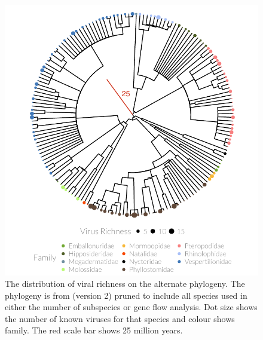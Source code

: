 \begin{knitrout}\footnotesize
{}\color{fgcolor}\begin{figure}[t]

{\centering \includegraphics[width=1\textwidth,trim = 0cm 0cm 0cm 0cm]{figure/A-treePlot2-1} 

}

\caption[Pruned alternative phylogeny with dot size showing number of pathogens and colour showing family.]{
The distribution of viral richness on the alternate phylogeny.
The phylogeny is from \textcite{jones2005bats} (version 2) pruned to include all species used in either the number of subspecies or gene flow analysis.
Dot size shows the number of known viruses for that species and colour shows family.
The red scale bar shows 25 million years.}\label{fig:treePlot2}
\end{figure}


\end{knitrout}













